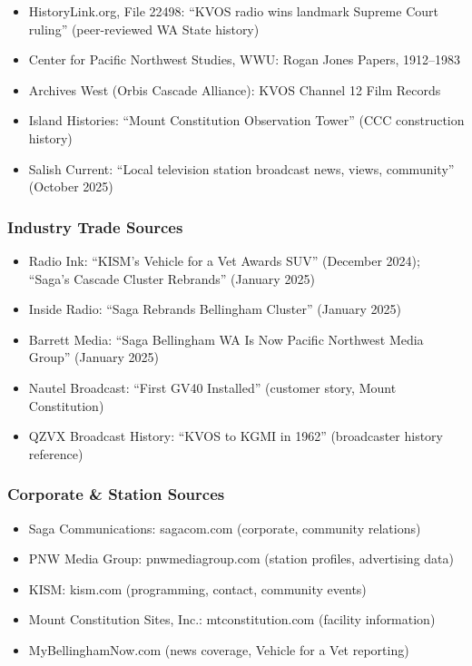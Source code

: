 \documentclass[11pt,letterpaper]{article}
\begin{document}
\begin{itemize}[nosep]
\item HistoryLink.org, File 22498: ``KVOS radio wins landmark Supreme Court ruling'' (peer-reviewed WA State history)
\item Center for Pacific Northwest Studies, WWU: Rogan Jones Papers, 1912--1983
\item Archives West (Orbis Cascade Alliance): KVOS Channel 12 Film Records
\item Island Histories: ``Mount Constitution Observation Tower'' (CCC construction history)
\item Salish Current: ``Local television station broadcast news, views, community'' (October 2025)
\end{itemize}

\subsubsection{Industry Trade Sources}

\begin{itemize}[nosep]
\item Radio Ink: ``KISM's Vehicle for a Vet Awards SUV'' (December 2024); ``Saga's Cascade Cluster Rebrands'' (January 2025)
\item Inside Radio: ``Saga Rebrands Bellingham Cluster'' (January 2025)
\item Barrett Media: ``Saga Bellingham WA Is Now Pacific Northwest Media Group'' (January 2025)
\item Nautel Broadcast: ``First GV40 Installed'' (customer story, Mount Constitution)
\item QZVX Broadcast History: ``KVOS to KGMI in 1962'' (broadcaster history reference)
\end{itemize}

\subsubsection{Corporate \& Station Sources}

\begin{itemize}[nosep]
\item Saga Communications: sagacom.com (corporate, community relations)
\item PNW Media Group: pnwmediagroup.com (station profiles, advertising data)
\item KISM: kism.com (programming, contact, community events)
\item Mount Constitution Sites, Inc.: mtconstitution.com (facility information)
\item MyBellinghamNow.com (news coverage, Vehicle for a Vet reporting)
\end{itemize}
\end{document}
